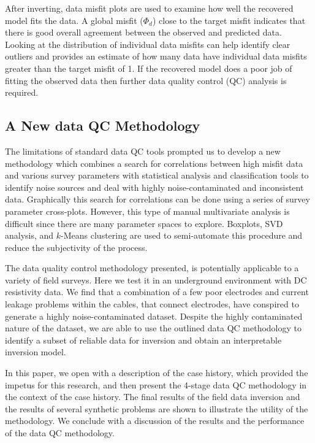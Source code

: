 \documentclass[final,authoryear,5p,times,twocolumn]{elsarticle}
\begin{document}
After inverting, data misfit plots are used to examine how well the recovered model fits the data. A global misfit ($\Phi_{d}$) close to the target misfit indicates that there is good overall agreement between the observed and predicted data. Looking at the distribution of individual data misfits can help identify clear outliers and provides an estimate of how many data have individual data misfits greater than the target misfit of 1. If the recovered model does a poor job of fitting the observed data then further data quality control (QC) analysis is required.

\subsection{A New data QC Methodology}

The limitations of standard data QC tools prompted us to develop a new methodology which combines a search for correlations between high misfit data and various survey parameters with statistical analysis and classification tools to identify noise sources and deal with highly noise-contaminated and inconsistent data. Graphically this search for correlations can be done using a series of survey parameter cross-plots. However, this type of manual multivariate analysis is difficult since there are many parameter spaces to explore. Boxplots, SVD analysis, and $k$-Means clustering \citep{MacQueen1967} are used to semi-automate this procedure and reduce the subjectivity of the process.

The data quality control methodology presented, is potentially applicable to a variety of field surveys. Here we test it in an underground environment with DC resistivity data. We find that a combination of a few poor electrodes and current leakage problems within the cables, that connect electrodes, have conspired to generate a highly noise-contaminated dataset. Despite the highly contaminated nature of the dataset, we are able to use the outlined data QC methodology to identify a subset of reliable data for inversion and obtain an interpretable inversion model.

In this paper, we open with a description of the case history, which provided the impetus for this research, and then present the 4-stage data QC methodology in the context of the case history. The final results of the field data inversion and the results of several synthetic problems are shown to illustrate the utility of the methodology. We conclude with a discussion of the results and the performance of the data QC methodology.
\end{document}
